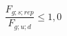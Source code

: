 \documentclass[12pt]{article}
\begin{document}
\begin{displaymath}
\frac {F_{g;s;rep}} {F_{g;u;d}} \leq 1,0
\end{displaymath}
\end{document}

